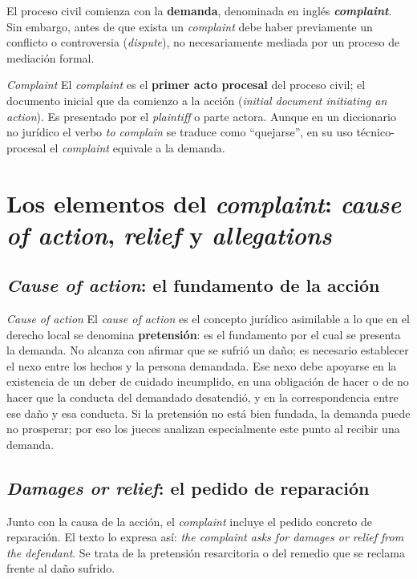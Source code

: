 \documentclass[12pt,oneside]{book}
\begin{document}
El proceso civil comienza con la \textbf{demanda}, denominada en inglés \textbf{\textit{complaint}}. Sin embargo, antes de que exista un \textit{complaint} debe haber previamente un conflicto o controversia (\textit{dispute}), no necesariamente mediada por un proceso de mediación formal.

\begin{definition}{\textit{Complaint}}
El \textit{complaint} es el \textbf{primer acto procesal} del proceso civil; el documento inicial que da comienzo a la acción (\textit{initial document initiating an action}). Es presentado por el \textit{plaintiff} o parte actora. Aunque en un diccionario no jurídico el verbo \textit{to complain} se traduce como ``quejarse'', en su uso técnico-procesal el \textit{complaint} equivale a la demanda.
\end{definition}

\section{Los elementos del \textit{complaint}: \textit{cause of action}, \textit{relief} y \textit{allegations}}

\subsection{\textit{Cause of action}: el fundamento de la acción}

\begin{definition}{\textit{Cause of action}}
El \textit{cause of action} es el concepto jurídico asimilable a lo que en el derecho local se denomina \textbf{pretensión}: es el fundamento por el cual se presenta la demanda. No alcanza con afirmar que se sufrió un daño; es necesario establecer el nexo entre los hechos y la persona demandada. Ese nexo debe apoyarse en la existencia de un deber de cuidado incumplido, en una obligación de hacer o de no hacer que la conducta del demandado desatendió, y en la correspondencia entre ese daño y esa conducta. Si la pretensión no está bien fundada, la demanda puede no prosperar; por eso los jueces analizan especialmente este punto al recibir una demanda.
\end{definition}

\subsection{\textit{Damages or relief}: el pedido de reparación}

Junto con la causa de la acción, el \textit{complaint} incluye el pedido concreto de reparación. El texto lo expresa así: \textit{the complaint asks for damages or relief from the defendant}. Se trata de la pretensión resarcitoria o del remedio que se reclama frente al daño sufrido.
\end{document}
